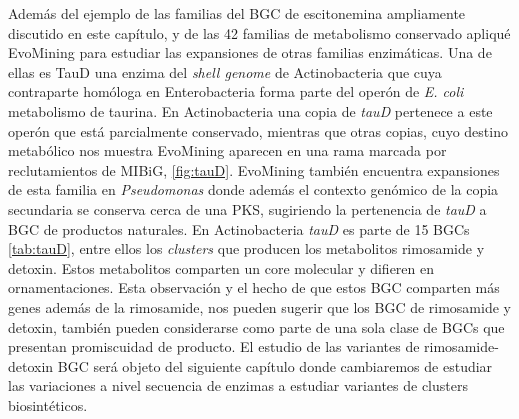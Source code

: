 \documentclass[12pt,twoside]{reedthesis}
\begin{document}
  Además del ejemplo de las familias del BGC de escitonemina ampliamente
  discutido en este capítulo, y de las 42 familias de metabolismo
  conservado apliqué EvoMining para estudiar las expansiones de otras
  familias enzimáticas. Una de ellas es TauD una enzima del \emph{shell
  genome} de Actinobacteria que cuya contraparte homóloga en
  Enterobacteria forma parte del operón de \emph{E. coli} metabolismo de
  taurina. En Actinobacteria una copia de \emph{tauD} pertenece a este
  operón que está parcialmente conservado, mientras que otras copias, cuyo
  destino metabólico nos muestra EvoMining aparecen en una rama marcada
  por reclutamientos de MIBiG, \autoref{fig:tauD}. EvoMining también
  encuentra expansiones de esta familia en \emph{Pseudomonas} donde además
  el contexto genómico de la copia secundaria se conserva cerca de una
  PKS, sugiriendo la pertenencia de \emph{tauD} a BGC de productos
  naturales. En Actinobacteria \emph{tauD} es parte de 15 BGCs
  \autoref{tab:tauD}, entre ellos los \emph{clusters} que producen los
  metabolitos rimosamide y detoxin. Estos metabolitos comparten un core
  molecular y difieren en ornamentaciones. Esta observación y el hecho de
  que estos BGC comparten más genes además de la rimosamide, nos pueden
  sugerir que los BGC de rimosamide y detoxin, también pueden considerarse
  como parte de una sola clase de BGCs que presentan promiscuidad de
  producto. El estudio de las variantes de rimosamide-detoxin BGC será
  objeto del siguiente capítulo donde cambiaremos de estudiar las
  variaciones a nivel secuencia de enzimas a estudiar variantes de
  clusters biosintéticos.
  
\end{document}
